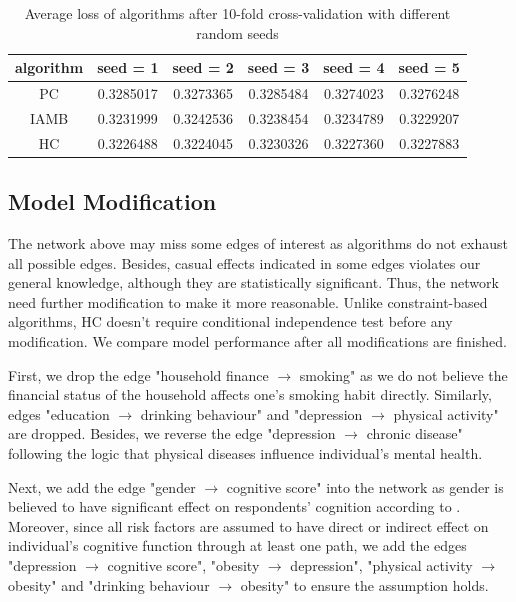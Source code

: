 \documentclass[11pt,twoside]{article}
\numberwithin{Theorem}{section}
\numberwithin{Definition}{section}
\numberwithin{Lemma}{section}
\numberwithin{Algorithm}{section}
\numberwithin{equation}{section}
\begin{document}
\begin{table}[!h]
	\centering
	\begin{tabular}{|c|c|c|c|c|c|}
		\hline
		algorithm & seed = 1 & seed = 2 & seed = 3 & seed = 4 & seed = 5 \\
		\hline
		PC & 0.3285017 & 0.3273365 & 0.3285484 & 0.3274023 &  0.3276248 \\
		IAMB & 0.3231999 & 0.3242536 & 0.3238454 & 0.3234789 & 0.3229207 \\
		HC & 0.3226488 & 0.3224045 & 0.3230326 & 0.3227360 & 0.3227883 \\
		\hline
	\end{tabular}
	\caption{Average loss of algorithms after 10-fold cross-validation with different random seeds}
	\label{tab:bn_cv}
\end{table}

\subsection{Model Modification}

 The network above may miss some edges of interest as algorithms do not exhaust all possible edges. Besides, casual effects indicated in some edges violates our general knowledge, although they are statistically significant. Thus, the network need further modification to make it more reasonable. Unlike constraint-based algorithms, HC doesn't require conditional independence test before any modification. We compare model performance after all modifications are finished.

First, we drop the edge "household finance $\rightarrow$ smoking" as we do not believe the financial status of the household affects one's smoking habit directly. Similarly, edges "education $\rightarrow$ drinking behaviour" and "depression $\rightarrow$ physical activity" are dropped. Besides, we reverse the edge "depression $\rightarrow$ chronic disease" following the logic that physical diseases influence individual's mental health.

Next, we add the edge "gender $\rightarrow$ cognitive score" into the network as gender is believed to have significant effect on respondents' cognition according to \cite{beam2018differences}. Moreover, since all risk factors are assumed to have direct or indirect effect on individual's cognitive function through at least one path, we add the edges "depression $\rightarrow$ cognitive score", "obesity $\rightarrow$ depression", "physical activity $\rightarrow$ obesity" and "drinking behaviour $\rightarrow$ obesity" to ensure the assumption holds. 
\end{document}
